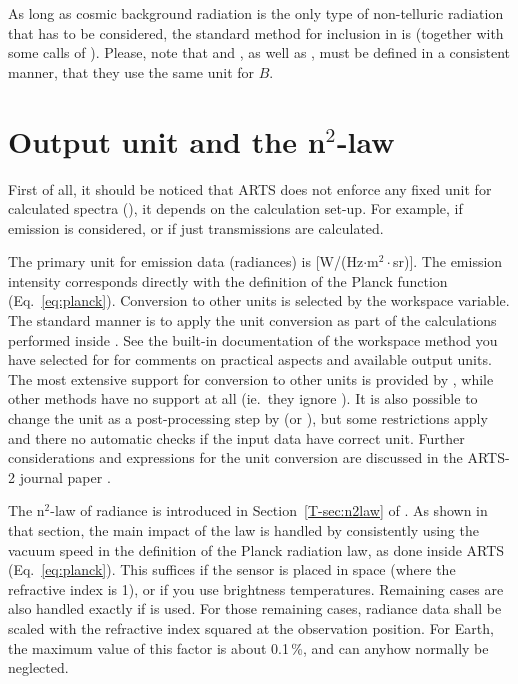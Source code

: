 As long as cosmic background radiation is the only type of non-telluric
radiation that has to be considered, the standard method for inclusion in
 is  (together with some calls
of ). Please, note that
 and ,
as well as , must be defined in a consistent
manner, that they use the same unit for $B$.






\section{Output unit and the n$^2$-law}
\label{sec:fm_defs:unit}

First of all, it should be noticed that ARTS does not enforce any fixed unit for
calculated spectra (), it depends on the calculation set-up. For
example, if emission is considered, or if just transmissions are calculated.

The primary unit for emission data (radiances) is [W/(Hz$\cdot$m$^2\cdot$sr)].
The emission intensity corresponds directly with the definition of the Planck
function (Eq.~\ref{eq:planck}). Conversion to other units is selected by the
 workspace variable. The standard manner is to apply the
unit conversion as part of the calculations performed inside
. See the built-in documentation of the workspace method you
have selected for  for comments on practical
aspects and available output units. The most extensive support for conversion
to other units is provided by , while other
methods have no support at all (ie.\ they ignore ). It is
also possible to change the unit as a post-processing step by
 (or ), but some restrictions apply
and there no automatic checks if the input data have correct unit. Further
considerations and expressions for the unit conversion are discussed in the
ARTS-2 journal paper \citep[][Sec.~5.7]{eriksson:arts2:11}.

The n$^2$-law of radiance is introduced in
Section~\ref{T-sec:n2law} of \theory. As shown in that section, the main impact
of the law is handled by consistently using the vacuum speed in the definition
of the Planck radiation law, as done inside ARTS (Eq.~\ref{eq:planck}). This
suffices if the sensor is placed in space (where the refractive index is 1), or
if you use brightness temperatures. Remaining cases are also handled exactly if
 is used. For those remaining cases, radiance
data shall be scaled with the refractive index squared at the observation
position. For Earth, the maximum value of this factor is about 0.1\,\%, and can
anyhow normally be neglected.


